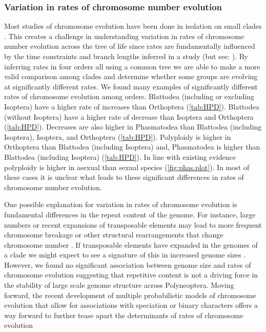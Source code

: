 \subsubsection{Variation in rates of chromosome number evolution}
Most studies of chromosome evolution have been done in isolation on small clades \citep{rockman2002, mccann2016, deoliveira}. 
This creates a challenge in understanding variation in rates of chromosome number evolution across the tree of life since rates are fundamentally influenced by the time constraints and branch lengths inferred in a study (but see: \citealt{blackmon2019meiotic, zenil2017}).
By inferring rates in four orders all using a common tree we are able to make a more valid comparison among clades and determine whether some groups are evolving at significantly different rates.
We found many examples of significantly different rates of chromosome evolution among orders.
Blattodea (including or excluding Isoptera) have a higher rate of increases than Orthoptera (\cref{tab:HPD}).
Blattodea (without Isoptera) have a higher rate of decrease than Isoptera and Orthoptera  (\cref{tab:HPD}).
Decreases are also higher in Phasmatodea than Blattodea (including Isoptera), Isoptera, and Orthoptera  (\cref{tab:HPD}).
Polyploidy is higher in Orthoptera than Blattodea (including Isoptera) and, Phasmatodea is higher than Blattodea (including Isoptera)  (\cref{tab:HPD}).
In line with existing evidence \citep{lokki1980polyploidy, blackmon2016} polyploidy is higher in asexual than sexual species (\cref{fig:phas.plot}).
In most of these cases it is unclear what leads to these significant differences in rates of chromosome number evolution.

One possible explanation for variation in rates of chromosome evolution is fundamental differences in the repeat content of the genome.
For instance, large numbers or recent expansions of transposable elements may lead to more frequent chromosome breakage or other structural rearrangements that change chromosome number \citep{carbone2014gibbon}.
If transposable elements have expanded in the genomes of a clade we might expect to see a signature of this in increased genome sizes \citep{kidwell2002transposable}.
However, we found no significant association between genome size and rates of chromosome evolution suggesting that repetitive content is not a driving force in the stability of large scale genome structure across Polyneoptera.
Moving forward, the recent development of multiple probabilistic models of chromosome evolution that allow for associations with speciation or binary characters offers a way forward to further tease apart the determinants of rates of chromosome evolution \citep{freyman2018, zenil2018chromploid, blackmon2019meiotic}

